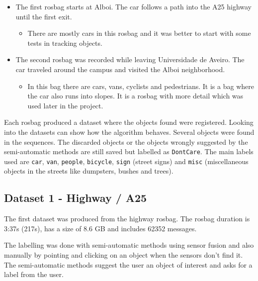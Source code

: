 \begin{itemize}
	\item The first rosbag starts at Alboi. The car follows a path into the A25 highway until the first exit.
		\begin{itemize}
			\item There are mostly cars in this rosbag and it was better to start with some tests in tracking objects.
		\end{itemize} 
	\item The second rosbag was recorded while leaving Universidade de Aveiro. The car traveled around the campus and visited the Alboi neighborhood.
		\begin{itemize}
		\item In this bag there are cars, vans, cyclists and pedestrians. It is a bag where the car also runs into slopes. It is a rosbag with more detail which was used later in the project.
		\end{itemize} 
\end{itemize} 


Each rosbag produced a dataset where the objects found were registered. Looking into the datasets can show how the algorithm behaves. Several objects were found in the sequences. The discarded objects or the objects wrongly suggested by the semi-automatic methods are still saved but labelled as \texttt{DontCare}. The main labels used are \texttt{car}, \texttt{van}, \texttt{people}, \texttt{bicycle}, \texttt{sign} (street signs) and \texttt{misc} (miscellaneous objects in the streets like dumpsters, bushes and trees).

\subsection{Dataset 1 - Highway / A25}

The first dataset was produced from the highway rosbag. The rosbag duration is 3:37s (217s), has a size of 8.6 GB and includes 62352 messages.

The labelling was done with semi-automatic methods using sensor fusion and also manually by pointing and clicking on an object when the sensors don't find it. The semi-automatic methods suggest the user an object of interest and asks for a label from the user.

